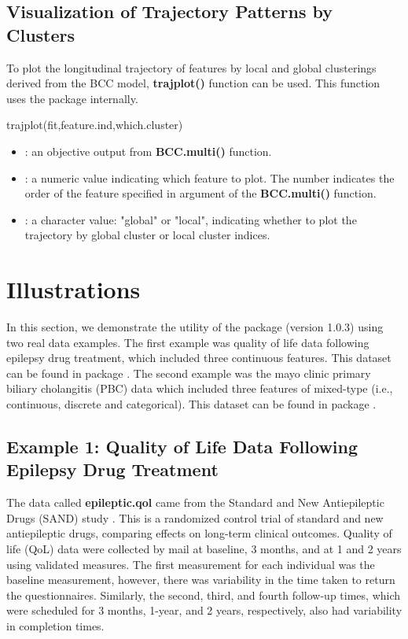 \subsection{Visualization of Trajectory Patterns by Clusters}
To plot the longitudinal trajectory of features by local and global clusterings derived from the BCC model, \textbf{trajplot()} function can be used. This function uses the  package internally. 
\begin{example}
trajplot(fit,feature.ind,which.cluster)
\end{example}

\begin{itemize}
	\item {}: an objective output from \textbf{BCC.multi()} function.  
	\item {}: a numeric value indicating which feature to plot. The number indicates the order of the feature specified in  argument of the \textbf{BCC.multi()} function.
	\item {}:  a character value: "global" or "local", indicating whether to plot the trajectory by global cluster or local cluster indices. 
\end{itemize}



\section{Illustrations} \label{sec:illustrations}
In this section, we demonstrate the utility of the  package (version 1.0.3) using two real data examples. The first example was quality of life data following epilepsy drug treatment, which included three continuous features. This dataset can be found in  package  \citep{Hickey2018}. The second example was the mayo clinic primary biliary cholangitis (PBC) data which included three features of mixed-type (i.e., continuous, discrete and categorical).  This dataset can be found in  package \citep{Komarek2014}.

\subsection{Example 1: Quality of Life Data Following Epilepsy Drug Treatment}
The data called \textbf{epileptic.qol} came from the Standard and New Antiepileptic Drugs (SAND) study \citep{Marson2007}. This is a randomized control trial of standard and new antiepileptic drugs, comparing effects on long-term clinical outcomes. Quality of life (QoL) data were collected by mail at baseline, 3 months, and at 1 and 2 years using validated measures. The first measurement for each individual was the baseline measurement, however, there was variability in the time taken to return the questionnaires. Similarly, the second, third, and fourth follow-up times, which were scheduled for 3 months, 1-year, and 2 years, respectively, also had variability in completion times. 

